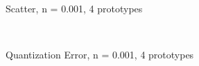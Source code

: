 \documentclass[10pt,a4paper]{article}
\begin{document}
\begin{figure}
  \centering
{} \\
  \caption{Scatter, n = 0.001, 4 prototypes}
  \label{fig:n0001_k4}
\end{figure}

\begin{figure}
  \centering
{} \\
  \caption{Quantization Error, n = 0.001, 4 prototypes}
  \label{fig:n0001_k4_learning}
\end{figure}
\end{document}
